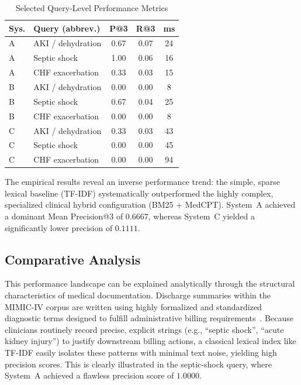 \documentclass[conference]{IEEEtran}
\begin{document}
\begin{table}[!t]
\caption{Selected Query-Level Performance Metrics}
\label{tab:query-metrics}
\centering
\footnotesize
\begin{tabular}{llccc}
\hline
\textbf{Sys.} & \textbf{Query (abbrev.)} & \textbf{P@3} & \textbf{R@3} & \textbf{ms} \\
\hline
A & AKI / dehydration & 0.67 & 0.07 & 24 \\
A & Septic shock & 1.00 & 0.06 & 16 \\
A & CHF exacerbation & 0.33 & 0.03 & 15 \\
B & AKI / dehydration & 0.00 & 0.00 & 8 \\
B & Septic shock & 0.67 & 0.04 & 25 \\
B & CHF exacerbation & 0.00 & 0.00 & 8 \\
C & AKI / dehydration & 0.33 & 0.03 & 43 \\
C & Septic shock & 0.00 & 0.00 & 45 \\
C & CHF exacerbation & 0.00 & 0.00 & 94 \\
\hline
\end{tabular}
\end{table}

The empirical results reveal an inverse performance trend: the simple, sparse lexical baseline (TF-IDF) systematically outperformed the highly complex, specialized clinical hybrid configuration (BM25 + MedCPT). System~A achieved a dominant Mean Precision@3 of $0.6667$, whereas System~C yielded a significantly lower precision of $0.1111$.

\subsection{Comparative Analysis}
This performance landscape can be explained analytically through the structural characteristics of medical documentation. Discharge summaries within the MIMIC-IV corpus are written using highly formalized and standardized diagnostic terms designed to fulfill administrative billing requirements~\cite{johnson2023mimic,alsentzer2019clinicalbert}. Because clinicians routinely record precise, explicit strings (e.g., ``septic shock'', ``acute kidney injury'') to justify downstream billing actions, a classical lexical index like TF-IDF easily isolates these patterns with minimal text noise, yielding high precision scores. This is clearly illustrated in the septic-shock query, where System~A achieved a flawless precision score of $1.0000$.
\end{document}
